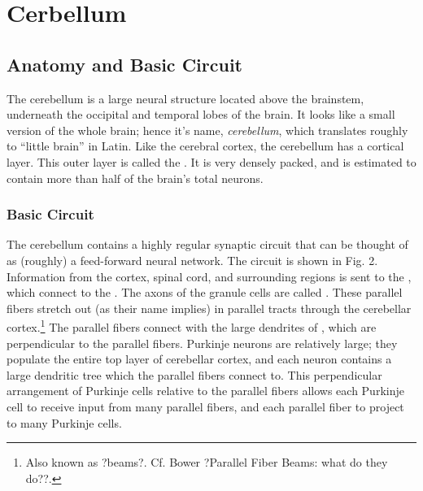 \chapter{Cerbellum}

\section{Anatomy and Basic Circuit}



The cerebellum is a large neural structure located above the brainstem, underneath the occipital and temporal lobes of the brain. It looks like a small version of the whole brain; hence it's name, \emph{cerebellum}, which translates roughly to ``little brain'' in Latin. Like the cerebral cortex, the cerebellum has a cortical layer. This outer layer is called the . It is very densely packed, and is estimated to contain more than half of the brain's total neurons.



\subsection{Basic Circuit}
 
The cerebellum contains a highly regular synaptic circuit that can be thought of as (roughly) a feed-forward neural network. The circuit is shown in Fig. 2. Information from the cortex, spinal cord, and surrounding regions is sent to the 
, which connect to the . The axons of the granule cells are called . These parallel fibers stretch out (as their name implies) in parallel tracts through the cerebellar cortex.\footnote{Also known as ?beams?. Cf. Bower ?Parallel Fiber Beams: what do they do??.}  The parallel fibers connect with the large dendrites of  , which are perpendicular to the parallel fibers. Purkinje neurons are relatively large; they populate the entire top layer of cerebellar cortex, and each neuron contains a large dendritic tree which the parallel fibers connect to. This perpendicular arrangement of Purkinje cells relative to the parallel fibers allows each Purkinje cell to receive input from many parallel fibers, and each parallel fiber to project to many Purkinje cells.
 
